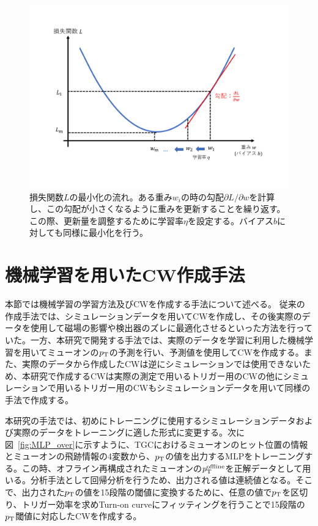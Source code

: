 \begin{figure}[tb]
  \centering
  \includegraphics[clip, width=15cm]{fig/4/lossfunc_laerning.pdf}
  \caption{損失関数$L$の最小化の流れ。ある重み$w_i$の時の勾配${\partial L}/{\partial w}$を計算し、この勾配が小さくなるように重みを更新することを繰り返す。この際、更新量を調整するために学習率$\eta$を設定する。バイアス$b$に対しても同様に最小化を行う。}
  \label{fig:lossfunction}
\end{figure}



\section{機械学習を用いたCW作成手法}
本節では機械学習の学習方法及びCWを作成する手法について述べる。
従来の作成手法では、シミュレーションデータを用いてCWを作成し、その後実際のデータを使用して磁場の影響や検出器のズレに最適化させるといった方法を行っていた。一方、本研究で開発する手法では、実際のデータを学習に利用した機械学習を用いてミューオンの$p_{\rm{T}}$の予測を行い、予測値を使用してCWを作成する。また、実際のデータから作成したCWは逆にシミュレーションでは使用できないため、本研究で作成するCWは実際の測定で用いるトリガー用のCWの他にシミュレーションで用いるトリガー用のCWもシミュレーションデータを用いて同様の手法で作成する。

本研究の手法では、初めにトレーニングに使用するシミュレーションデータおよび実際のデータをトレーニングに適した形式に変更する。次に図~\ref{fig:MLP_over}に示すように、TGCにおけるミューオンのヒット位置の情報とミューオンの飛跡情報の4変数から、$p_{\rm{T}}$の値を出力するMLPをトレーニングする。この時、オフライン再構成されたミューオンの$p_{\rm{T}}^{\rm{offline}}$を正解データとして用いる。分析手法として回帰分析を行うため、出力される値は連続値となる。そこで、出力された$p_{\rm{T}}$の値を15段階の閾値に変換するために、任意の値で$p_{\rm{T}}$を区切り、トリガー効率を求めTurn-on curveにフィッティングを行うことで15段階の$p_{\rm{T}}$閾値に対応したCWを作成する。

